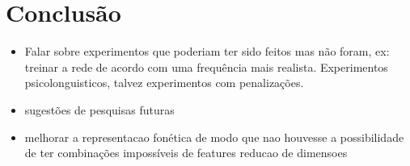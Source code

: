 \chapter{Conclusão}
\label{ch:08}
\begin{itemize}
    \item Falar sobre experimentos que poderiam ter sido feitos mas não foram, ex: treinar a rede de acordo com uma frequência mais realista. Experimentos psicolonguisticos, talvez experimentos com penalizações.
    \item sugestões de pesquisas futuras
    \item melhorar a representacao fonética de modo que nao houvesse a possibilidade de ter combinações impossíveis de features
    reducao de dimensoes 
\end{itemize}
